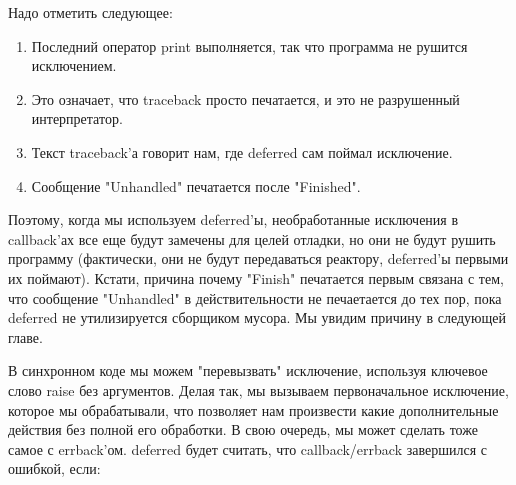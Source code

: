 Надо отметить следующее:

\begin{enumerate}

\item Последний оператор print выполняется, так что программа не 
рушится исключением.

\item Это означает, что traceback просто печатается, и это не разрушенный интерпретатор.

\item Текст traceback'а говорит нам, где deferred сам поймал исключение.

\item Сообщение "Unhandled" печатается после "Finished".

\end{enumerate}


Поэтому, когда мы используем deferred'ы, необработанные 
исключения в callback'ах все еще будут замечены для 
целей отладки, но они не будут рушить программу (фактически, 
они не будут передаваться реактору, deferred'ы первыми их поймают). 
Кстати, причина почему "Finish" печатается первым связана с тем, 
что сообщение "Unhandled" в действительности не печаетается 
до тех пор, пока deferred  не утилизируется сборщиком мусора. 
Мы увидим причину в следующей главе.


В синхронном коде мы можем "перевызвать" исключение, 
используя ключевое слово raise без аргументов. Делая так, 
мы вызываем первоначальное исключение, которое мы обрабатывали, 
что позволяет нам произвести какие дополнительные действия без 
полной его обработки. В свою очередь, мы может сделать тоже 
самое с errback'ом. deferred будет считать, что 
callback/errback завершился с ошибкой, если:  

